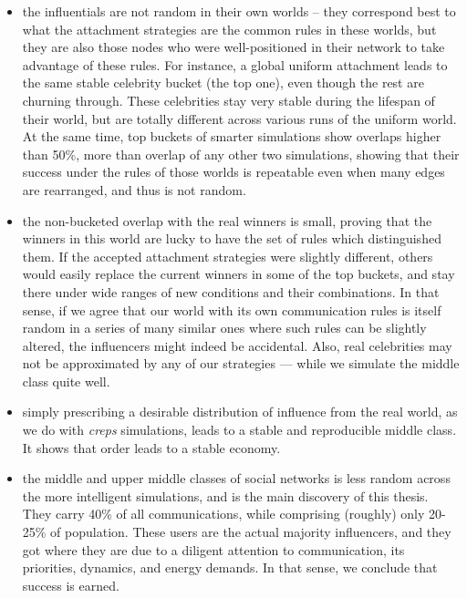 \documentclass[10pt,oneside]{memoir}
\begin{document}
\begin{itemize}


\item the influentials are not random in their own worlds -- they correspond best to what the attachment strategies are the common rules in these worlds, but they are also those nodes who were well-positioned in their network to take advantage of these rules.  For instance, a global uniform attachment leads to the same stable celebrity bucket (the top one), even though the rest are churning through.  These celebrities stay very stable during the lifespan of their world, but are totally different across various runs of the uniform world.  At the same time, top buckets of smarter simulations show overlaps higher than 50\%, more than overlap of any other two simulations, showing that their success under the rules of those worlds is repeatable even when many edges are rearranged, and thus is not random.




\item the non-bucketed overlap with the real winners is small, proving that the winners in this world are lucky to have the set of rules which distinguished them.  If the accepted attachment strategies were slightly different, others would easily replace the current winners in some of the top buckets, and stay there under wide ranges of new conditions and their combinations.  In that sense, if we agree that our world with its own communication rules is itself random in a series of many similar ones where such rules can be slightly altered, the influencers might indeed be accidental.   Also, real celebrities may not be approximated by any of our strategies --- while we simulate the middle class quite well.




\item simply prescribing a desirable distribution of influence from the real world, as we do with {\itshape creps} simulations, leads to a stable and reproducible middle class.  It shows that order leads to a stable economy.




\item the middle and upper middle classes of social networks is less random across the more intelligent simulations, and is the main discovery of this thesis.  They carry 40\% of all communications, while comprising (roughly) only 20-25\% of population.  These users are the actual majority influencers, and they got where they are due to a diligent attention to communication, its priorities, dynamics, and energy demands.  In that sense, we conclude that success is earned.





\end{itemize}
\end{document}
